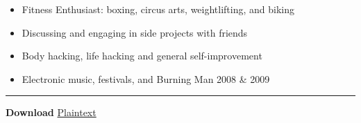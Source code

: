\documentclass{article}
\begin{document}
\begin{itemize}%
\item Fitness Enthusiast: boxing, circus arts, weightlifting, and biking
\item Discussing and engaging in side projects with friends
\item Body hacking, life hacking and general self-improvement
\item Electronic music, festivals, and Burning Man 2008 & 2009

\end{itemize}

\vspace{.5em} \hrule \vspace{.5em}
\textbf{Download} \href{https://raw.github.com/dereckrx/dereckrx.github.com/master/resume.md}{Plaintext}
\end{document}

